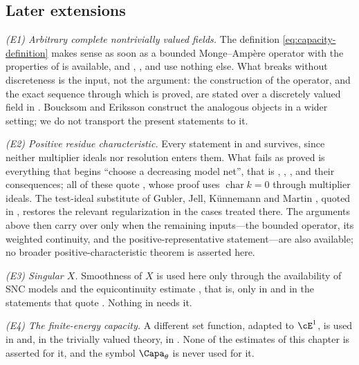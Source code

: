 \subsection{Later extensions}
\label{sec:ch25-later}

\emph{(E1) Arbitrary complete nontrivially valued fields.}  The definition
\eqref{eq:capacity-definition} makes sense as soon as a bounded
Monge--Amp\`ere operator with the properties of
 is available, and
, ,
 and
 use nothing else.  What breaks
without discreteness is the input, not the argument: the construction of the
operator, and the exact sequence  through which
 is proved, are stated over a
discretely valued field in .  Boucksom and
Eriksson \cite{BE21} construct the analogous objects in a wider setting; we
do not transport the present statements to it.

\emph{(E2) Positive residue characteristic.}  Every statement in
 and  survives, since
neither multiplier ideals nor resolution enters them.  What fails as proved
is everything that begins ``choose a decreasing model net'', that is
,
,
,
 and their consequences; all of these
quote , whose proof uses
$\operatorname{char}k=0$ through multiplier ideals.  The test-ideal
substitute of Gubler, Jell, K\"unnemann and Martin \cite{GJKM19}, quoted in
, restores the relevant
regularization in the cases treated there.  The arguments above then carry
over only when the remaining inputs---the bounded operator, its weighted
continuity, and the positive-representative statement---are also available;
no broader positive-characteristic theorem is asserted here.

\emph{(E3) Singular $X$.}  Smoothness of $X$ is used here only through
the availability of SNC models and the equicontinuity estimate
, that is, only in
 and in the statements that quote
.  Nothing in
 needs it.

\emph{(E4) The finite-energy capacity.}  A different set function, adapted
to $\cE^1$, is used in  and, in the
trivially valued theory, in .  None of the
estimates of this chapter is asserted for it, and the symbol
$\Capa_\theta$ is never used for it.

